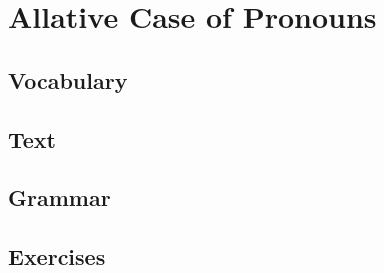 \chapter{Allative Case of Pronouns}
\section*{Vocabulary}
\section*{Text}
\section*{Grammar}
\section*{Exercises}
